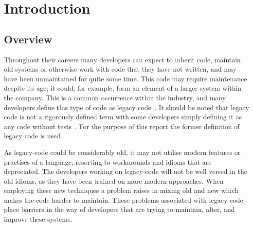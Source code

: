 \documentclass[bsc,frontabs,singlespacing,twoside,parskip,deptreport]{infthesis}
\begin{document}
\chapter{Introduction} \label{chp:intro-report}

\section{Overview}


Throughout their careers many developers can expect to inherit code, maintain old systems or otherwise work with code that they have not written, and may have been unmaintained for quite some time. This code may require maintenance despite its age; it could, for example, form an element of a larger system within the company. This is a common occurrence within the industry, and many developers define this type of code as legacy code~\cite{LEGACY_CODE}. It should be noted that legacy code is not a rigorously defined term with some developers simply defining it as any code without tests~\cite{feathers2004working}. For the purpose of this report the former definition of legacy code is used. 


As legacy-code could be considerably old, it may not utilise modern features or practises of a language, resorting to workarounds and idioms that are depreciated. The developers working on legacy-code will not be well versed in the old idioms, as they have been trained on more modern approaches. When employing these new techniques a problem raises in mixing old and new which makes the code harder to maintain. These problems associated with legacy code place barriers in the way of developers that are trying to maintain, alter, and improve these systems.



    
\end{document}
